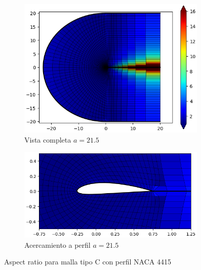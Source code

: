 \documentclass[letterpaper, openright, 12pt]{book}
\begin{document}
\begin{figure}[htbp!]
\begin{subfigure}[c]{0.48\textwidth}
            \includegraphics[keepaspectratio, width=0.99\textwidth]
                {./img/naca4415_c_aa_215_aspect_far}
            \caption{Vista completa $a=21.5$}
            \label{fig:naca4415_c_aa_215_aspect_far}
        \end{subfigure}
        \hfill
        \begin{subfigure}[c]{0.48\textwidth}
            \includegraphics[keepaspectratio, width=0.99\textwidth]
                {./img/naca4415_c_aa_215_aspect_close}
            \caption{Acercamiento a perfil $a=21.5$}
            \label{fig:naca4415_c_aa_215_aspect_close}
        \end{subfigure}
        \caption{Aspect ratio para malla tipo C con perfil NACA 4415}
        \label{fig:naca4415_c_aspect_1}
    \end{figure}
\end{document}
